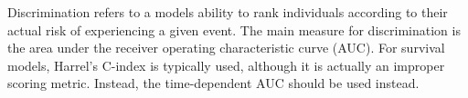 Discrimination refers to a models ability to rank individuals according 
to their actual risk of experiencing a given event.
The main measure for discrimination is the area under the receiver
operating characteristic curve (AUC).
For survival models, Harrel's C-index is typically used,
although it is actually an improper scoring metric.
Instead, the time-dependent AUC should be used instead.









